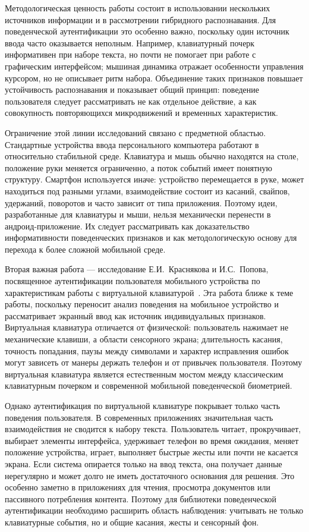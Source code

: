 \documentclass[oneside,senior,etd]{BYUPhys}
\begin{document}
Методологическая ценность работы состоит в использовании нескольких источников информации и в рассмотрении гибридного распознавания. Для поведенческой аутентификации это особенно важно, поскольку один источник ввода часто оказывается неполным. Например, клавиатурный почерк информативен при наборе текста, но почти не помогает при работе с графическим интерфейсом; мышиная динамика отражает особенности управления курсором, но не описывает ритм набора. Объединение таких признаков повышает устойчивость распознавания и показывает общий принцип: поведение пользователя следует рассматривать не как отдельное действие, а как совокупность повторяющихся микродвижений и временных характеристик.

Ограничение этой линии исследований связано с предметной областью. Стандартные устройства ввода персонального компьютера работают в относительно стабильной среде. Клавиатура и мышь обычно находятся на столе, положение руки меняется ограниченно, а поток событий имеет понятную структуру. Смартфон используется иначе: устройство перемещается в руке, может находиться под разными углами, взаимодействие состоит из касаний, свайпов, удержаний, поворотов и часто зависит от типа приложения. Поэтому идеи, разработанные для клавиатуры и мыши, нельзя механически перенести в андроид-приложение. Их следует рассматривать как доказательство информативности поведенческих признаков и как методологическую основу для перехода к более сложной мобильной среде.

Вторая важная работа --- исследование Е.И.~Краснякова и И.С.~Попова, посвященное аутентификации пользователя мобильного устройства по характеристикам работы с виртуальной клавиатурой~\cite{krasnyakov2017virtualkeyboard}. Эта работа ближе к теме работы, поскольку переносит анализ поведения на мобильное устройство и рассматривает экранный ввод как источник индивидуальных признаков. Виртуальная клавиатура отличается от физической: пользователь нажимает не механические клавиши, а области сенсорного экрана; длительность касания, точность попадания, паузы между символами и характер исправления ошибок могут зависеть от манеры держать телефон и от привычек пользователя. Поэтому виртуальная клавиатура является естественным мостом между классическим клавиатурным почерком и современной мобильной поведенческой биометрией.

Однако аутентификация по виртуальной клавиатуре покрывает только часть поведения пользователя. В современных приложениях значительная часть взаимодействия не сводится к набору текста. Пользователь читает, прокручивает, выбирает элементы интерфейса, удерживает телефон во время ожидания, меняет положение устройства, играет, выполняет быстрые жесты или почти не касается экрана. Если система опирается только на ввод текста, она получает данные нерегулярно и может долго не иметь достаточного основания для решения. Это особенно заметно в приложениях для чтения, просмотра документов или пассивного потребления контента. Поэтому для библиотеки поведенческой аутентификации необходимо расширить область наблюдения: учитывать не только клавиатурные события, но и общие касания, жесты и сенсорный фон.
\end{document}

